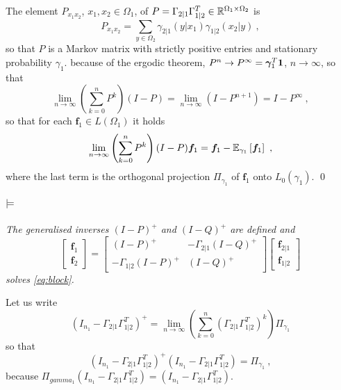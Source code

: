 \documentclass[runningheads]{llncs}
\begin{document}
The element $P_{x_1x_2}$, $x_1,x_2 \in \Omega_1$, of $P = \Gamma_{2|1}\Gamma_{1|2}^T \in \mathbb R^{\Omega_1 \times \Omega_2}$ is
%
\begin{equation*}
  P_{x_1x_2} = \sum_{y \in \Omega_2} \gamma_{2|1}(y|x_1) \gamma_{1|2}(x_2|y) \ ,
\end{equation*}
%
so that $P$ is a Markov matrix with strictly positive entries and stationary probability $\gamma_1$. because of the ergodic theorem, $P^n \to P^\infty = {\bm \gamma}_1^T \bm 1$, $n \to \infty$, so that 
%
\begin{equation*}
\lim_{n\to\infty} \left(\sum_{k=0}^n P^k\right)(I-P) = \lim_{n\to\infty} \left(I - P^{n+1}\right) = I - P^\infty \ , 
\end{equation*}
%
so that for each $\bm f_1 \in L(\Omega_1)$ it holds
%
\begin{equation*}
  \lim_{n\to\infty} \left(\sum_{k=0}^n P^k\right)(I-P) \bm f_1 = \bm f_1 - {\operatorname{\mathbb E}}_{\gamma_1}\left[\bm f_1\right] \ ,
\end{equation*}
%
where the last term is the orthogonal projection $\Pi_{\gamma_1}$ of $\bm f_1$ onto $L_0(\gamma_1)$. \qed

\paragraph{$\bf\models$} \emph{The generalised inverses $(I-P)^+$ and $(I-Q)^+$ are defined and 
%
  \begin{equation*}
  \begin{bmatrix}
    \bm f_1 \\ \bm f_2
  \end{bmatrix}
=
    \begin{bmatrix}
      (I - P)^+ & - \Gamma_{2|1}(I - Q)^+ \\
- \Gamma_{1|2}(I-P)^+ & (I-Q)^+
    \end{bmatrix}
    \begin{bmatrix}
      \bm f_{2|1} \\ \bm f_{1|2}
    \end{bmatrix}
  \end{equation*}
%
solves \cref{eq:block}.}

  Let us write
%
\begin{equation*}
  (I_{n_1}-\Gamma_{2|1}\Gamma_{1|2}^T)^{+} = \lim_{n\to\infty} \left(\sum_{k=0}^n (\Gamma_{2|1}\Gamma_{1|2}^T)^k\right) \Pi_{\gamma_1}  
\end{equation*}
%
so that
%
\begin{equation*}
  (I_{n_1}-\Gamma_{2|1}\Gamma_{1|2}^T)^{+}(I_{n_1}-\Gamma_{2|1}\Gamma_{1|2}^T) = \Pi_{\gamma_1} \ ,
\end{equation*}
%
because $\Pi_{gamma_1} (I_{n_1}-\Gamma_{2|1}\Gamma_{1|2}^T) = (I_{n_1}-\Gamma_{2|1}\Gamma_{1|2}^T)$.
\end{document}
